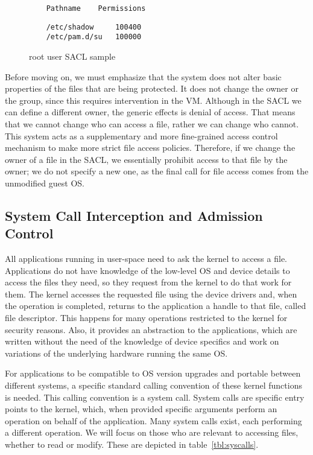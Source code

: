\begin{figure}[ht]
	\centering
	\begin{lstlisting}
	Pathname	Permissions	
	\end{lstlisting}
	\footnotesize{\selectfont 
	\begin{lstlisting}
	/etc/shadow     100400
	/etc/pam.d/su   100000
	\end{lstlisting}}
	\caption{root user \ac{SACL} sample}
	\label{fig:root_sacl}
\end{figure}


\par Before moving on, we must emphasize that the system does not alter basic properties of the files that are being protected. It does not change the owner or the group, since this requires intervention in the \ac{VM}. Although in the \ac{SACL} we can define a different owner, the generic effects is denial of access. That means that we cannot change who can access a file, rather we can change who cannot. This system acts as a supplementary and more fine-grained access control mechanism to make more strict file access policies. Therefore, if we change the owner of a file in the \ac{SACL}, we essentially prohibit access to that file by the owner; we do not specify a new one, as the final call for file access comes from the unmodified guest \ac{OS}.



\subsection{System Call Interception and Admission Control}\label{sub:syscalls}


\par All applications running in user-space need to ask the kernel to access a file. Applications do not have knowledge of the low-level \ac{OS} and device details to access the files they need, so they request from the kernel to do that work for them. The kernel accesses the requested file using the device drivers and, when the operation is completed, returns to the application a handle to that file, called file descriptor. This happens for many operations restricted to the kernel for security reasons. Also, it provides an abstraction to the applications, which are written without the need of the knowledge of device specifics and work on variations of the underlying hardware running the same \ac{OS}. 

\par For applications to be compatible to \ac{OS} version upgrades and portable between different systems, a specific standard calling convention of these kernel functions is needed. This calling convention is a system call. System calls are specific entry points to the kernel, which, when provided specific arguments perform an operation on behalf of the application. Many system calls exist, each performing a different operation. We will focus on those who are relevant to accessing files, whether to read or modify. These are depicted in table~\ref{tbl:syscalls}.

